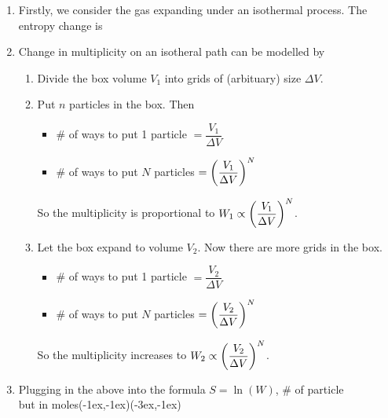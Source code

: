 \documentclass[class=article, crop=false, 12pt]{standalone}
\begin{document}
\begin{enumerate}
    \item Firstly, we consider the gas expanding under an isothermal process.
    The entropy change is

    \item Change in multiplicity on an isotheral path can be modelled by
    \begin{enumerate}
        \item Divide the box volume $V_1$ into grids of (arbituary) size $\Delta V$.

        \item Put $n$ particles in the box. Then
        \begin{itemize}
            \item \# of ways to put 1 particle $=\dfrac{V_1}{\Delta V}$
            \item \# of ways to put $N$ particles $=\qty(\dfrac{V_1}{\Delta V})^N$
        \end{itemize}
        So the multiplicity is proportional to $W_1 \propto \qty(\dfrac{V_1}{\Delta V})^N$.

        \item Let the box expand to volume $V_2$. 
        Now there are more grids in the box.
        \begin{itemize}
            \item \# of ways to put 1 particle $=\dfrac{V_2}{\Delta V}$
            \item \# of ways to put $N$ particles $=\qty(\dfrac{V_2}{\Delta V})^N$
        \end{itemize}
        So the multiplicity increases to $W_2 \propto \qty(\dfrac{V_2}{\Delta V})^N$.
    \end{enumerate}

    \item Plugging in the above into the formula $S=\ln(W)$,
    {\scriptsize \# of particle\\[-1ex]\scriptsize but in moles}{(-1ex,-1ex)}{(-3ex,-1ex)}
\end{enumerate}
\end{document}
